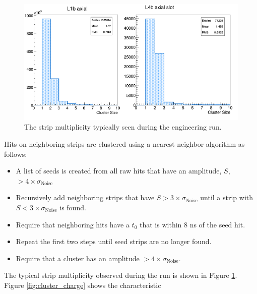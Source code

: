 \begin{figure}[h!t]
    \centering
    \includegraphics[width=\textwidth]{images/cluster_size.png}
    \caption{The strip multiplicity typically seen during the engineering run.}
    \label{fig:strip_mult}
\end{figure}  
Hits on neighboring strips are clustered using a nearest neighbor
algorithm as follows: 
\begin{itemize}
    \item A list of seeds is created from all raw hits that have an amplitude, $S$,
          $> 4\times \sigma_{\text{Noise}}$
  \item Recursively add neighboring strips that have $S> 3 \times \sigma_{\text{Noise}}$
          until a strip with $S < 3\times \sigma_{\text{Noise}}$ is found.
      \item Require that neighboring hits have a $t_{0}$ that is within 8 ns of the seed hit.
    \item Repeat the first two steps until seed strips are no longer found.
\item Require that a cluster has an amplitude $> 4 \times \sigma_{\text{Noise}}$.
\end{itemize}
The typical strip multiplicity observed during the run is shown in Figure 
\ref{fig:strip_mult}. Figure \ref{fig:cluster_charge} shows the characteristic
